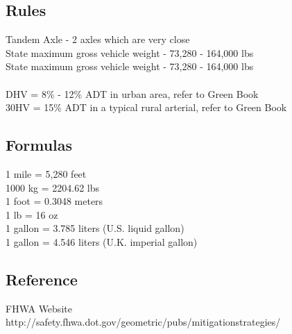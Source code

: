 \documentclass{article}
\begin{document}
  \subsection{Rules}
  Tandem Axle - 2 axles which are very close\\
  State maximum gross vehicle weight - 73,280 - 164,000 lbs\\
  State maximum gross vehicle weight - 73,280 - 164,000 lbs\\
  \\
  DHV = 8\% - 12\% ADT in urban area, refer to Green Book\\
  30HV = 15\% ADT in a typical rural arterial, refer to Green Book\\

  \subsection{Formulas}
  1 mile = 5,280 feet \\
  1000 kg = 2204.62 lbs \\
  1 foot = 0.3048 meters \\
  1 lb = 16 oz \\
  1 gallon = 3.785 liters (U.S. liquid gallon) \\
  1 gallon = 4.546 liters (U.K. imperial gallon) \\


  \subsection{Reference}
  FHWA Website \\
  http://safety.fhwa.dot.gov/geometric/pubs/mitigationstrategies/ \\
\end{document}
